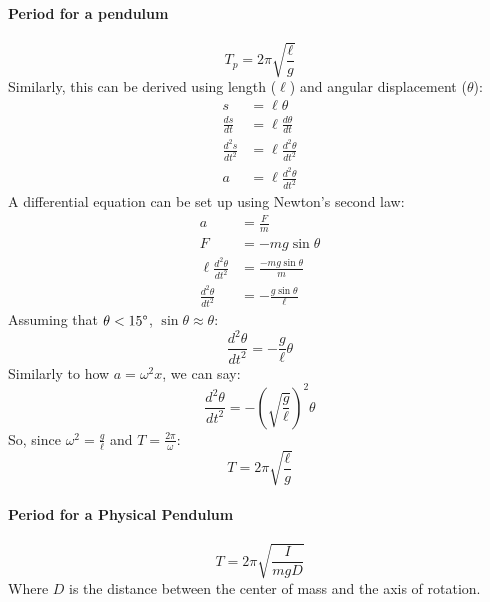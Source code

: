 \documentclass{article}
\begin{document}
            \paragraph{Period for a pendulum}
            \begin{equation}
                T_p = 2 \pi \sqrt{\frac{\ell}{g}}
            \end{equation}
            Similarly, this can be derived using length ($\ell$) and angular displacement ($\theta$):
            \begin{align}
                s &= \ell \theta \nonumber\\
                \frac{ds}{dt} &= \ell \frac{d\theta}{dt} \nonumber\\
                \frac{d^2s}{dt^2} &= \ell \frac{d^2\theta}{dt^2} \nonumber\\
                a &= \ell \frac{d^2\theta}{dt^2} \nonumber
            \end{align}
            A differential equation can be set up using Newton's second law:
            \begin{align}
                a &= \frac{F}{m} \nonumber\\
                F &= - m g \sin \theta \nonumber\\
                \ell \frac{d^2\theta}{dt^2} &= \frac{- mg \sin \theta}{m} \nonumber\\
                \frac{d^2\theta}{dt^2} &= - \frac{g \sin \theta}{\ell} \nonumber
            \end{align}
            Assuming that $\theta < 15 \degree$, $\sin \theta \approx \theta$:
            \begin{equation}
                \frac{d^2\theta}{dt^2} = - \frac{g}{\ell} \theta \nonumber
            \end{equation}
            Similarly to how $a = \omega^2 x$, we can say:
            \begin{equation}
                \frac{d^2\theta}{dt^2} = - \left( \sqrt{\frac{g}{\ell}} \right)^2 \theta \nonumber
            \end{equation}
            So, since $\omega^2 = \frac{g}{\ell}$ and $T = \frac{2\pi}{\omega}$:
            \begin{equation}
                T = 2 \pi \sqrt{\frac{\ell}{g}} \nonumber
            \end{equation}

            \paragraph{Period for a Physical Pendulum}
            \begin{equation}
                T = 2 \pi \sqrt{\frac{I}{mgD}}
            \end{equation}
            Where $D$ is the distance between the center of mass and the axis of rotation.
\end{document}

